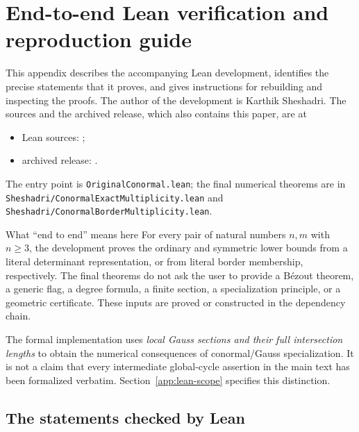 \begingroup
\def\UrlFont{\small\ttfamily}
\setlength{\LTpre}{0.5\baselineskip}
\setlength{\LTpost}{0.5\baselineskip}
\section{End-to-end Lean verification and reproduction guide}
\label{app:lean-verification}

This appendix describes the accompanying Lean development, identifies the
precise statements that it proves, and gives instructions for rebuilding and
inspecting the proofs.  The author of the development is Karthik Sheshadri.  The sources and the
archived release, which also contains this paper, are at
\begin{itemize}[leftmargin=*]
\item Lean sources: \leanRepositoryURL;
\item archived release: \leanArchiveDOI.
\end{itemize}
The entry point is \nolinkurl{OriginalConormal.lean}; the final numerical
theorems are in \nolinkurl{Sheshadri/ConormalExactMultiplicity.lean} and
\nolinkurl{Sheshadri/ConormalBorderMultiplicity.lean}.

\begin{readerbox}{What ``end to end'' means here}
For every pair of natural numbers $n,m$ with $n\geq3$, the development proves
the ordinary and symmetric lower bounds from a literal determinant
representation, or from literal border membership, respectively.  The final
theorems do not ask the user to provide a B\'ezout theorem, a generic flag,
a degree formula, a finite section, a specialization principle, or a geometric
certificate.  These inputs are proved or constructed in the dependency chain.

The formal implementation uses \emph{local Gauss sections and their full
intersection lengths} to obtain the numerical consequences of
conormal/Gauss specialization.  It is not a claim that every intermediate
global-cycle assertion in the main text has been formalized verbatim.
Section~\ref{app:lean-scope} specifies this distinction.
\end{readerbox}

\subsection{The statements checked by Lean}
\label{app:lean-statements}

